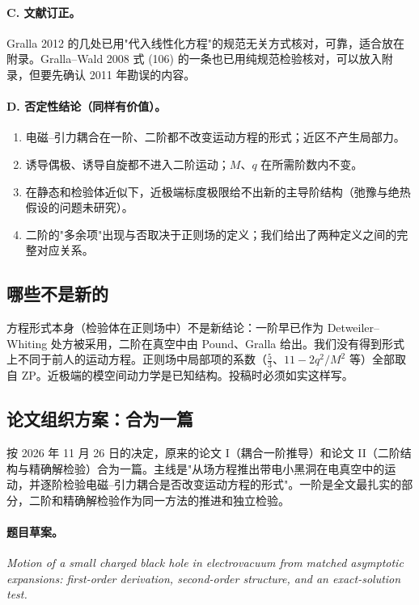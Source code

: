 \documentclass[11pt,a4paper]{ctexart}
\numberwithin{equation}{section}
\begin{document}
\paragraph{C. 文献订正。}Gralla 2012 的几处已用"代入线性化方程"的规范无关方式核对，可靠，适合放在附录。Gralla--Wald 2008 式 (106) 的一条也已用纯规范检验核对，可以放入附录，但要先确认 2011 年勘误的内容。

\paragraph{D. 否定性结论（同样有价值）。}
\begin{enumerate}
\item 电磁--引力耦合在一阶、二阶都不改变运动方程的形式；近区不产生局部力。
\item 诱导偶极、诱导自旋都不进入二阶运动；$M$、$q$ 在所需阶数内不变。
\item 在静态和检验体近似下，近极端标度极限给不出新的主导阶结构（弛豫与绝热假设的问题未研究）。
\item 二阶的"多余项"出现与否取决于正则场的定义；我们给出了两种定义之间的完整对应关系。
\end{enumerate}

\subsection{哪些不是新的}

方程形式本身（检验体在正则场中）不是新结论：一阶早已作为 Detweiler--Whiting 处方被采用，二阶在真空中由 Pound、Gralla 给出。我们没有得到形式上不同于前人的运动方程。正则场中局部项的系数（$\tfrac53$、$11-2q^2/M^2$ 等）全部取自 ZP。近极端的模空间动力学是已知结构。投稿时必须如实这样写。

\subsection{论文组织方案：合为一篇}

按 2026 年 11 月 26 日的决定，原来的论文 I（耦合一阶推导）和论文 II（二阶结构与精确解检验）合为一篇。主线是"从场方程推出带电小黑洞在电真空中的运动，并逐阶检验电磁--引力耦合是否改变运动方程的形式"。一阶是全文最扎实的部分，二阶和精确解检验作为同一方法的推进和独立检验。

\paragraph{题目草案。}\emph{Motion of a small charged black hole in electrovacuum from matched asymptotic expansions: first-order derivation, second-order structure, and an exact-solution test.}
\end{document}
